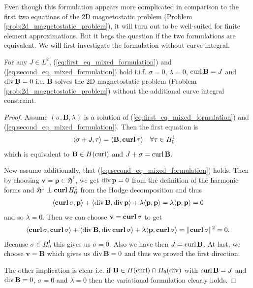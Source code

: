 \documentclass[../master_thesis.tex]{subfiles}
\begin{document}
Even though this formulation appears more complicated in comparison to the first two equations of 
the 2D magnetostatic problem (Problem\,\ref{prob:2d_magnetostatic_problem}), 
it will turn out to be well-suited for finite element approximations.
But it begs the question if the two formulations are equivalent. We will first 
investigate the formulation without curve integral.

\begin{proposition}\label{prop:equivalence_first_two_equations}
    For any $J \in L^2$, (\ref{eq:first_eq_mixed_formulation}) and 
    (\ref{eq:second_eq_mixed_formulation}) hold i.i.f. 
    $\sigma = 0$, $\lambda=0$, $\curl \mathbf{B} = J$ and 
    $\diver \mathbf{B} = 0$
    i.e. $\mathbf{B}$ solves the 2D magnetostatic problem (Problem\,\ref{prob:2d_magnetostatic_problem})  
    without the additional curve integral
    constraint.
\end{proposition}
\begin{proof}
    Assume $(\sigma,\mathbf{B},\lambda)$ is a solution of (\ref{eq:first_eq_mixed_formulation}) and 
    (\ref{eq:second_eq_mixed_formulation}). Then the first equation is
    \begin{align*}
        \langle \sigma + J, \tau \rangle  
        &=  \langle \mathbf{B}, \veccurl\tau \rangle  \quad \forall \tau \in H^1_0
    \end{align*}
    which is equivalent to $\mathbf{B} \in H(\curl)$ and $J + \sigma = \curl \mathbf{B}$.

    Now assume additionally, that  
    (\ref{eq:second_eq_mixed_formulation}) holds. Then by choosing $\mathbf{v} = \mathbf{p} \in \mathfrak{H}^1$,
    we get $\diver \mathbf{p} = 0$ from the definition of the harmonic forms 
    and $\mathfrak{H}^1 \perp \veccurl H^1_0$ from the Hodge decomposition and thus
    \begin{align*}
        \langle \veccurl \sigma, \mathbf{p} \rangle + \langle \diver \mathbf{B}, \diver\mathbf{p}\rangle 
            + \lambda\langle \mathbf{p}, \mathbf{p} \rangle
        = \lambda \langle \mathbf{p}, \mathbf{p}\rangle = 0
    \end{align*}
    and so $\lambda = 0$. Then we can choose $\mathbf{v} = \veccurl \sigma$ to get 
    \begin{align*}
        \langle \veccurl \sigma, \veccurl \sigma \rangle + \langle \diver \mathbf{B}, \diver \veccurl \sigma \rangle 
            + \lambda \langle \mathbf{p}, \veccurl \sigma \rangle
        = \lVert \veccurl \sigma \rVert^2 = 0.
    \end{align*}
    Because $\sigma \in H^1_0$ this gives us $\sigma = 0$. Also we have then 
    $J = \curl \mathbf{B}$. At last, we choose $\mathbf{v} = \mathbf{B}$ which gives us 
    $\diver \mathbf{B} = 0$ and thus we proved the first direction. 

    The other implication is clear i.e. if $\mathbf{B} \in H(\curl) \cap H_0(\diver)$
    with $\curl \mathbf{B} = J$ and $\diver \mathbf{B} = 0$, $\sigma=0$ and $\lambda = 0$ then the variational 
    formulation clearly holds.
    \end{proof}
\end{document}
